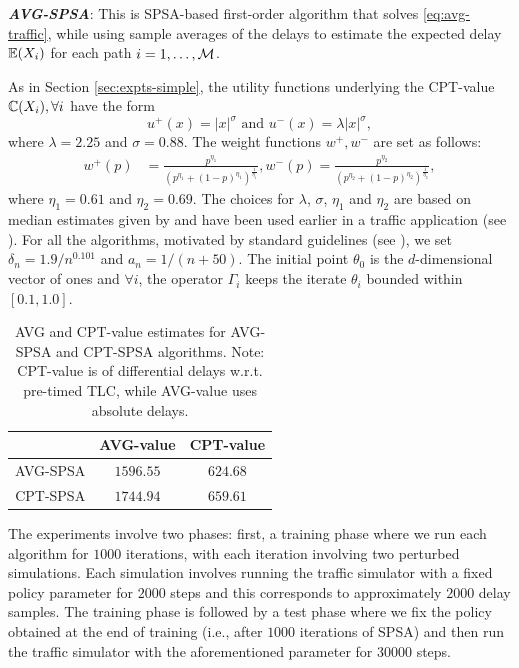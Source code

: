 {\bf\em AVG-SPSA}: This is SPSA-based first-order algorithm that solves \eqref{eq:avg-traffic}, while using sample averages of the delays to estimate the expected delay $\mathbb{E}(X_i)$ for each path $i=1,\ldots,\mathcal{M}$. 

As in Section \ref{sec:expts-simple}, the utility functions underlying the CPT-value $\mathbb{C}(X_i), \forall i$ have the form
$$u^+(x) =  |x|^{\sigma} \text{ and  }u^-(x) = \lambda |x|^{\sigma},$$ 
where $\lambda = 2.25$ and $\sigma = 0.88$.
The weight functions $w^+,w^-$ are set as follows:
\begin{align*}
w^+(p) &= \frac{p^{\eta_1}}{{(p^{\eta_1}+ (1-p)^{\eta_1})}^{\frac{1}{\eta_1}}}, w^-(p) = \frac{p^{\eta_2}}{{(p^{\eta_2}+ (1-p)^{\eta_2})}^{\frac{1}{\eta_2}}},
\end{align*} 
where $\eta_1 = 0.61$ and $\eta_2 = 0.69$. The choices for $\lambda$, $\sigma$, $\eta_1$ and $\eta_2$ are based on median estimates given by \cite{tversky1992advances} and have been used earlier in a traffic application (see \cite{gao2010adaptive}).
For all the algorithms,
 motivated by standard guidelines (see \cite{spall2005introduction}),
 we set $\delta_n = 1.9/n^{0.101}$ and $a_n = 1/(n+50)$. The initial point $\theta_0$ is the $d$-dimensional vector of ones and $\forall i$, the operator $\Gamma_i$ keeps the iterate $\theta_i$ bounded within $[0.1, 1.0]$.

\begin{table}
 \centering
  \caption{AVG and CPT-value estimates for AVG-SPSA and CPT-SPSA algorithms. Note: CPT-value is of differential delays w.r.t. pre-timed TLC, while 
  AVG-value uses absolute delays.}
  \label{tab:cpt-results}
 \begin{tabular}{|c|c|c|}
  \toprule 
   & \textbf{AVG-value}& \textbf{CPT-value }\\\midrule
   AVG-SPSA & $\bm{1596.55}$ & $624.68$ \\\midrule
   CPT-SPSA & $1744.94$ & $\bm{659.61}$\\
   \bottomrule
  \end{tabular}
%   
%   
\end{table}

 
The experiments involve two phases:
first, a training phase where we run each algorithm for $1000$ iterations, with each iteration involving two perturbed simulations. Each simulation involves running the traffic simulator with a fixed policy parameter for $2000$ steps and this corresponds to approximately $2000$ delay samples. The training phase is followed by a test phase where we fix the policy obtained at the end of training (i.e., after $1000$ iterations of SPSA) and then run the traffic simulator with the aforementioned parameter for $30000$ steps. 

